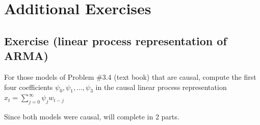 \documentclass[12pt]{article}
\newcommand{\nl}{\vspace{0.1in}\noindent}
\begin{document}
\section{Additional Exercises}

\subsection{Exercise (linear process representation of ARMA)}


For those models of Problem \#3.4 (text book) that are causal, compute the first four coefficients $\psi_0, \psi_1, \dots, \psi_3$ in the causal linear process representation $x_t = \sum_{j=0}^{\infty} \psi_j w_{t-j}$

\nl \soln*

\nl Since both models were causal, will complete in 2 parts.
\end{document}
